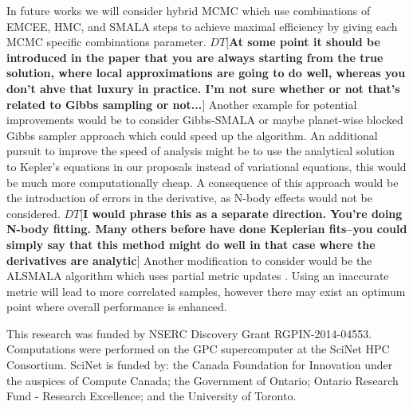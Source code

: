 \documentclass{aa}
\def\memodt#1{\color{green}$DT[${\bf #1}$]$ \color{black}}
\begin{document}
In future works we will consider hybrid MCMC which use combinations of  EMCEE, HMC, and SMALA steps to achieve maximal efficiency by giving each MCMC specific combinations parameter. 
\memodt{At some point it should be introduced in the paper that you are always starting from the true solution, where local approximations are going to do well, whereas you don't ahve that luxury in practice. I'm not sure whether or not that's related to Gibbs sampling or not...}
Another example for potential improvements would be to consider Gibbs-SMALA or maybe planet-wise blocked Gibbs sampler approach which could speed up the algorithm. 
An additional pursuit to improve the speed of analysis might be to use the analytical solution to Kepler's equations in our proposals instead of variational equations, this would be much more computationally cheap. 
A consequence of this approach would be the introduction of errors in the derivative, as N-body effects would not be considered. \memodt{I would phrase this as a separate direction. You're doing N-body fitting. Many others before have done Keplerian fits--you could simply say that this method might do well in that case where the derivatives are analytic}
Another modification to consider would be the ALSMALA algorithm which uses partial metric updates \cite{1608.07986}. 
Using an inaccurate metric will lead to more correlated samples, however there may exist an optimum point where overall performance is enhanced.

\begin{acknowledgements}
	This research was funded by NSERC Discovery Grant RGPIN-2014-04553. 
Computations were performed on the GPC supercomputer at the SciNet HPC Consortium. 
SciNet is funded by: the Canada Foundation for Innovation under the auspices of Compute Canada; the Government of Ontario; Ontario Research Fund - Research Excellence; and the University of Toronto.
\end{acknowledgements}





\end{document}
